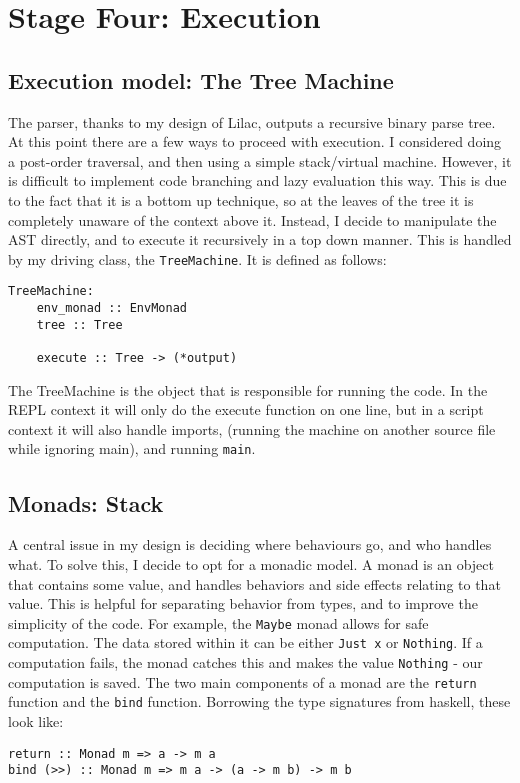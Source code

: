 \documentclass[a4paper, 11pt]{report}
\begin{document}
{{\section{Stage Four: Execution}\label{sec:stage-four-execution}
\subsection{Execution model: The Tree Machine}\label{sec:execution-model-the-tree-machine}
The parser, thanks to my design of Lilac, outputs a recursive binary parse tree. At this point there are a few ways to proceed with execution. I considered doing a post-order traversal, and then using a simple stack/virtual machine. However, it is difficult to implement code branching and lazy evaluation this way. This is due to the fact that it is a bottom up technique, so at the leaves of the tree it is completely unaware of the context above it. Instead, I decide to manipulate the AST directly, and to execute it recursively in a top down manner. This is handled by my driving class, the \verb|TreeMachine|. It is defined as follows:\\
\begin{verbatim}
TreeMachine:
    env_monad :: EnvMonad
    tree :: Tree
    
    execute :: Tree -> (*output)
\end{verbatim}

The TreeMachine is the object that is responsible for running the code. In the REPL context it will only do the execute function on one line, but in a script context it will also handle imports, (running the machine on another source file while ignoring main), and running \verb|main|.\\

\subsection{Monads: Stack}\label{sec:monads-stack}
A central issue in my design is deciding where behaviours go, and who handles what. To solve this, I decide to opt for a monadic model. A monad is an object that contains some value, and handles behaviors and side effects relating to that value. This is helpful for separating behavior from types, and to improve the simplicity of the code. For example, the \verb|Maybe| monad allows for safe computation. The data stored within it can be either \verb|Just x| or \verb|Nothing|. If a computation fails, the monad catches this and makes the value \verb|Nothing| - our computation is saved. The two main components of a monad are the \verb|return| function and the \verb|bind| function. Borrowing the type signatures from haskell, these look like:
\begin{verbatim}
return :: Monad m => a -> m a
bind (>>) :: Monad m => m a -> (a -> m b) -> m b
\end{verbatim}

}}
\end{document}
